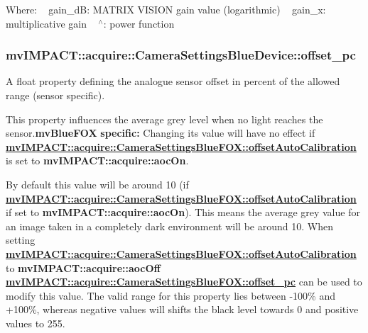 Where\+: ~\newline
{\ttfamily gain\+\_\+d\+B\+:} M\+A\+T\+R\+I\+X V\+I\+S\+I\+O\+N gain value (logarithmic) ~\newline
{\ttfamily gain\+\_\+x\+:} multiplicative gain ~\newline
{\ttfamily $^\wedge$}\+: power function ~\newline
\hypertarget{classmv_i_m_p_a_c_t_1_1acquire_1_1_camera_settings_blue_device_aa3bbc947f98f3182b8bd0121a511b1c2}{
\subsubsection[{offset\+\_\+pc}]{ mv\+I\+M\+P\+A\+C\+T\+::acquire\+::\+Camera\+Settings\+Blue\+Device\+::offset\+\_\+pc}}\label{classmv_i_m_p_a_c_t_1_1acquire_1_1_camera_settings_blue_device_aa3bbc947f98f3182b8bd0121a511b1c2}


A float property defining the analogue sensor offset in percent of the allowed range (sensor specific). 

This property influences the average grey level when no light reaches the sensor.{\bfseries mv\+Blue\+F\+O\+X} {\bfseries specific\+:} Changing its value will have no effect if {\bfseries \hyperlink{classmv_i_m_p_a_c_t_1_1acquire_1_1_camera_settings_blue_f_o_x_a94b65c4b3b21b5f968ddee1dc804db34}{mv\+I\+M\+P\+A\+C\+T\+::acquire\+::\+Camera\+Settings\+Blue\+F\+O\+X\+::offset\+Auto\+Calibration}} is set to {\bfseries mv\+I\+M\+P\+A\+C\+T\+::acquire\+::aoc\+On}.

By default this value will be around 10 (if {\bfseries \hyperlink{classmv_i_m_p_a_c_t_1_1acquire_1_1_camera_settings_blue_f_o_x_a94b65c4b3b21b5f968ddee1dc804db34}{mv\+I\+M\+P\+A\+C\+T\+::acquire\+::\+Camera\+Settings\+Blue\+F\+O\+X\+::offset\+Auto\+Calibration}} if set to {\bfseries mv\+I\+M\+P\+A\+C\+T\+::acquire\+::aoc\+On}). This means the average grey value for an image taken in a completely dark environment will be around 10. When setting {\bfseries \hyperlink{classmv_i_m_p_a_c_t_1_1acquire_1_1_camera_settings_blue_f_o_x_a94b65c4b3b21b5f968ddee1dc804db34}{mv\+I\+M\+P\+A\+C\+T\+::acquire\+::\+Camera\+Settings\+Blue\+F\+O\+X\+::offset\+Auto\+Calibration}} to {\bfseries mv\+I\+M\+P\+A\+C\+T\+::acquire\+::aoc\+Off} {\bfseries \hyperlink{classmv_i_m_p_a_c_t_1_1acquire_1_1_camera_settings_blue_device_aa3bbc947f98f3182b8bd0121a511b1c2}{mv\+I\+M\+P\+A\+C\+T\+::acquire\+::\+Camera\+Settings\+Blue\+F\+O\+X\+::offset\+\_\+pc}} can be used to modify this value.  The valid range for this property lies between -\/100\% and +100\%, whereas negative values will shifts the black level towards 0 and positive values to 255.

